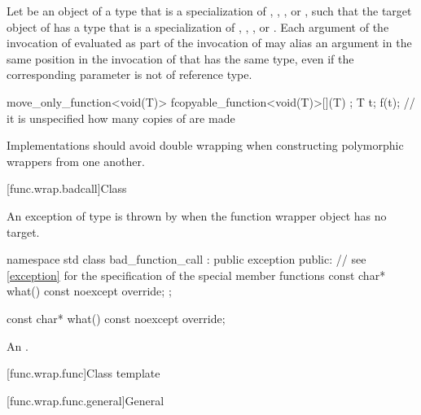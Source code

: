 \pnum
Let  be an object of a type that is a specialization of
, , ,
or ,
such that the target object  of  has a type that
is a specialization of
, , ,
or .
Each argument of the
invocation of  evaluated as part of the invocation of 
may alias an argument in the same position in the invocation of  that
has the same type, even if the corresponding parameter is not of reference type.
\begin{example}
\begin{codeblock}
move_only_function<void(T)> f{copyable_function<void(T)>{[](T) {}}};
T t;
f(t);                               // it is unspecified how many copies of  are made
\end{codeblock}
\end{example}

\pnum
\recommended
Implementations should avoid double wrapping when
constructing polymorphic wrappers from one another.

[func.wrap.badcall]{Class }%
%

\pnum
An exception of type  is thrown by
when the function wrapper object has no target.

\begin{codeblock}
namespace std {
  class bad_function_call : public exception {
  public:
    // see \ref{exception} for the specification of the special member functions
    const char* what() const noexcept override;
  };
}
\end{codeblock}

%
\begin{itemdecl}
const char* what() const noexcept override;
\end{itemdecl}

\begin{itemdescr}
\pnum
\returns
An
 \ntbs{}.
\end{itemdescr}

[func.wrap.func]{Class template }

[func.wrap.func.general]{General}
%

